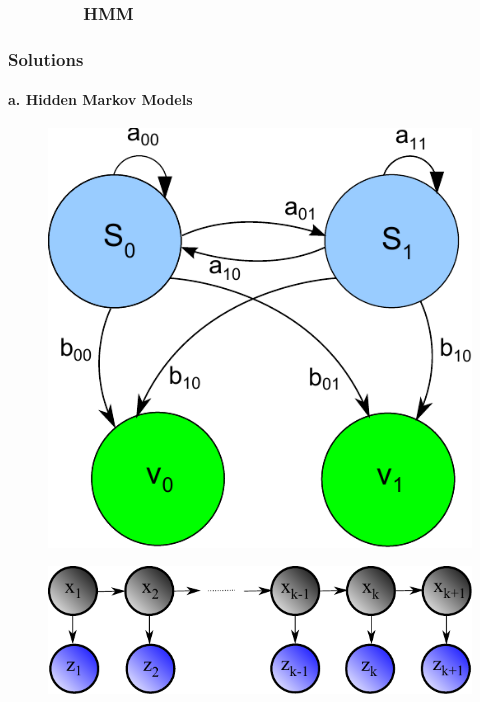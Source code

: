 \documentclass{beamer}
\begin{document}
\subsubsection{\ \ \ \ \ \ \ \ HMM }
\begin{frame}
\frametitle{Solutions}
\framesubtitle{a. Hidden Markov Models}
\mypagenum
\begin{figure}
\includegraphics[height=0.3\textheight]{figs/HMM_flowDiagram.pdf}
\end{figure}
\begin{figure}
\includegraphics[width=1.0\textwidth]{figs/HMM_flowDiagram2.pdf}
\end{figure}
\end{frame}
\end{document}

